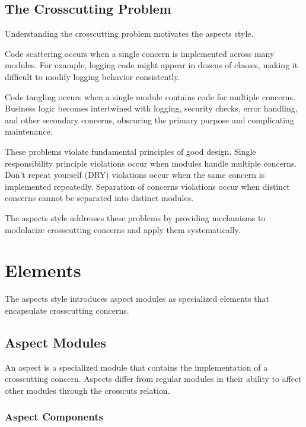 \documentclass[11pt]{article}
\begin{document}
\subsection{The Crosscutting Problem}

Understanding the crosscutting problem motivates the aspects style.

Code scattering occurs when a single concern is implemented across many modules. For example, logging code might appear in dozens of classes, making it difficult to modify logging behavior consistently.

Code tangling occurs when a single module contains code for multiple concerns. Business logic becomes intertwined with logging, security checks, error handling, and other secondary concerns, obscuring the primary purpose and complicating maintenance.

These problems violate fundamental principles of good design. Single responsibility principle violations occur when modules handle multiple concerns. Don't repeat yourself (DRY) violations occur when the same concern is implemented repeatedly. Separation of concerns violations occur when distinct concerns cannot be separated into distinct modules.

The aspects style addresses these problems by providing mechanisms to modularize crosscutting concerns and apply them systematically.

\section{Elements}

The aspects style introduces aspect modules as specialized elements that encapsulate crosscutting concerns.

\subsection{Aspect Modules}

An aspect is a specialized module that contains the implementation of a crosscutting concern. Aspects differ from regular modules in their ability to affect other modules through the crosscuts relation.

\subsubsection{Aspect Components}
\end{document}
